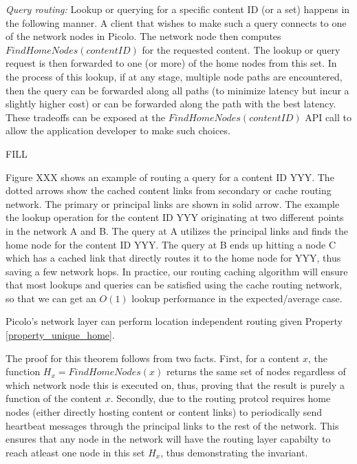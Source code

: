 {\em Query routing:} Lookup or querying for a specific content ID (or a set) happens in the following manner. A client
that wishes to make such a query connects to one of the network nodes in Picolo. The network node then computes
\(FindHomeNodes(contentID)\) for the requested content. The lookup or query request is then forwarded to one (or more)
of the home nodes from this set. In the process of this lookup, if at any stage, multiple node paths are encountered,
then the query can be forwarded along all paths (to minimize latency but incur a slightly higher cost) or can be
forwarded along the path with the best latency. These tradeoffs can be exposed at the \(FindHomeNodes(contentID)\) API
call to allow the application developer to make such choices.

FILL

Figure XXX shows an example of routing a query for a content ID YYY. The dotted arrows show the cached content links from
secondary or cache routing network. The primary or principal links are shown in solid arrow. The example the lookup operation
for the content ID YYY originating at two different points in the network A and B. The query at A utilizes the principal
links and finds the home node for the content ID YYY. The query at B ends up hitting a node C which has a cached link that
directly routes it to the home node for YYY, thus saving a few network hops. In practice, our routing caching algorithm will
ensure that most lookups and queries can be satisfied using the cache routing network, so that we can get an \(O(1)\) lookup
performance in the expected/average case.

\begin{theorem}
Picolo's network layer can perform location independent routing given Property \ref{property_unique_home}.
\end{theorem}

The proof for this theorem follows from two facts. First, for a content \(x\), the function \(H_x = FindHomeNodes(x)\) returns
the same set of nodes regardless of which network node this is executed on, thus, proving that the result is purely a function
of the content \(x\). Secondly, due to the routing protcol requires home nodes (either directly hosting content or content links)
to periodically send heartbeat messages through the principal links to the rest of the network. This ensures that any node in the 
network will have the routing layer capabilty to reach atleast one node in this set \(H_x\), thus demonstrating the invariant. 

